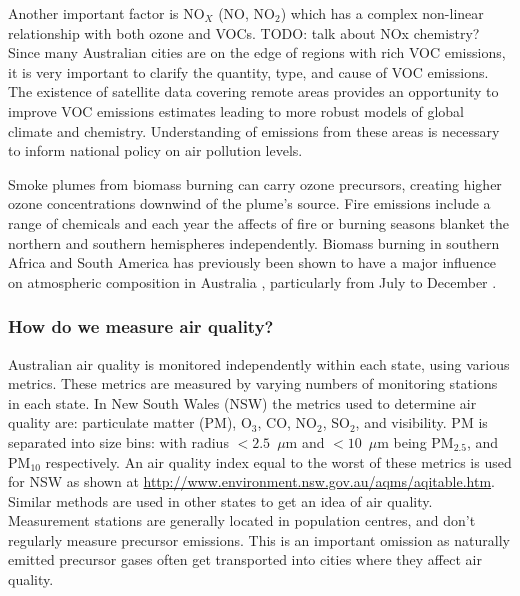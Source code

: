       Another important factor is NO$_X$ (NO, NO$_2$) which has a complex non-linear relationship with both ozone and VOCs. TODO: talk about NOx chemistry?
      Since many Australian cities are on the edge of regions with rich VOC emissions, it is very important to clarify the quantity, type, and cause of VOC emissions.
      The existence of satellite data covering remote areas provides an opportunity to improve VOC emissions estimates leading to more robust models of global climate and chemistry.
      Understanding of emissions from these areas is necessary to inform national policy on air pollution levels.
      
      Smoke plumes from biomass burning can carry ozone precursors, creating higher ozone concentrations downwind of the plume's source.
      Fire emissions include a range of chemicals and each year the affects of fire or burning seasons blanket the northern and southern hemispheres independently.
      Biomass burning in southern Africa and South America has previously been shown to have a major influence on atmospheric composition in Australia \citep{Oltmans2001, Gloudemans2006, Edwards2006}, particularly from July to December \citep{Pak2003, Liu2016}.
    
    \subsubsection{How do we measure air quality?}
    
      Australian air quality is monitored independently within each state, using various metrics. These metrics are measured by varying numbers of monitoring stations in each state.
      In New South Wales (NSW) the metrics used to determine air quality are: particulate matter (PM), O$_3$, CO, NO$_2$, SO$_2$, and visibility.
      PM is separated into size bins: with radius $< 2.5 $~$\mu$m and $<10$~$\mu$m being PM$_{2.5}$, and PM$_{10}$ respectively.
      An air quality index equal to the worst of these metrics is used for NSW as shown at \url{http://www.environment.nsw.gov.au/aqms/aqitable.htm}.
      Similar methods are used in other states to get an idea of air quality.
      Measurement stations are generally located in population centres, and don't regularly measure precursor emissions. 
      This is an important omission as naturally emitted precursor gases often get transported into cities where they affect air quality.
      
